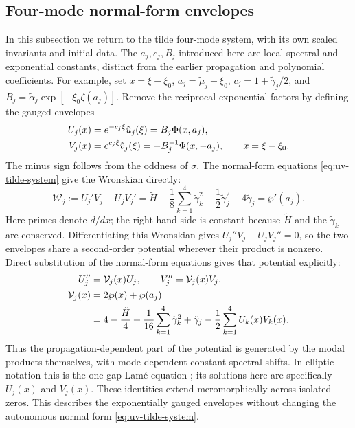 \documentclass[11pt,a4paper]{article}
\numberwithin{equation}{section}
\begin{document}
\subsection{Four-mode normal-form envelopes}
In this subsection we return to the tilde four-mode system, with its own scaled invariants and initial data.
The $a_j,c_j,B_j$ introduced here are local spectral and exponential constants, distinct from the earlier propagation and polynomial coefficients.
For example, set $x=\xi-\xi_0$, $a_j=\tilde\mu_j-\xi_0$, $c_j=1+\tilde\gamma_j/2$, and $B_j=\tilde\alpha_j\exp[-\xi_0\zeta(a_j)]$.
Remove the reciprocal exponential factors by defining the gauged envelopes
\begin{align}
U_j(x)&=e^{-c_j\xi}\tilde u_j(\xi)=B_j\Phi(x,a_j),\notag\\
V_j(x)&=e^{c_j\xi}\tilde v_j(\xi)=-B_j^{-1}\Phi(x,-a_j),
\qquad x=\xi-\xi_0.
\label{eq:tilde-ba-pair}
\end{align}
The minus sign follows from the oddness of $\sigma$.
The normal-form equations \eqref{eq:uv-tilde-system} give the Wronskian directly:
\begin{equation}
\mathcal W_j:=U_j'V_j-U_jV_j'
=\tilde H-\frac18\sum_{k=1}^4\tilde\gamma_k^2
-\frac12\tilde\gamma_j^2-4\tilde\gamma_j
=\wp'(a_j).
\label{eq:ba-wronskian}
\end{equation}
Here primes denote $d/dx$; the right-hand side is constant because $\tilde H$ and the $\tilde\gamma_k$ are conserved.
Differentiating this Wronskian gives $U_j''V_j-U_jV_j''=0$, so the two envelopes share a second-order potential wherever their product is nonzero.
Direct substitution of the normal-form equations gives that potential explicitly:
\begin{align}
U_j''&=\mathcal V_j(x)U_j,\qquad
V_j''=\mathcal V_j(x)V_j,\notag\\
\mathcal V_j(x)&=2\wp(x)+\wp(a_j)\notag\\
&=4-\frac{\tilde H}{4}+\frac1{16}\sum_{k=1}^4\tilde\gamma_k^2
+\tilde\gamma_j-\frac12\sum_{k=1}^4 U_k(x)V_k(x).
\label{eq:ba-lame}
\end{align}
Thus the propagation-dependent part of the potential is generated by the modal products themselves, with mode-dependent constant spectral shifts.
In elliptic notation this is the one-gap Lam\'e equation \cite[Eq.~(1.9)]{kricheverEllipticSolutionsNonlinear1994}; its solutions here are specifically $U_j(x)$ and $V_j(x)$.
These identities extend meromorphically across isolated zeros.
This describes the exponentially gauged envelopes without changing the autonomous normal form \eqref{eq:uv-tilde-system}.
\end{document}
